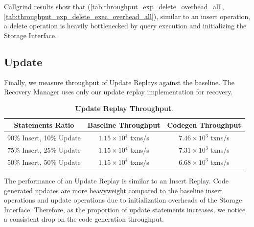 \documentclass[12pt]{cmuthesis}
\begin{document}
\begin{table}[H]
\begin{center}
\caption{\textbf{Callgrind breakdown on the Query Execution step of a Delete Replay step}.}
\label{tab:throughput_exp_delete_exec_overhead_all}
\end{center}
\end{table}

Callgrind results show that (\cref{tab:throughput_exp_delete_overhead_all}, \cref{tab:throughput_exp_delete_exec_overhead_all}), similar to an insert operation, a delete operation is heavily bottlenecked by query execution and initializing the Storage Interface.

\subsection{Update}
Finally, we measure throughput of Update Replays against the baseline. The Recovery Manager uses only our update replay implementation for recovery.
\begin{table}[H]
\begin{center}
\begin{tabular}{ c c c } 
 \toprule
\textbf{Statements Ratio} & \textbf{Baseline Throughput} & \textbf{Codegen Throughput}\\ 
 \toprule
 90\% Insert, 10\% Update & $1.15 \times 10^4$ txns/s & $7.46 \times 10^3$ txns/s\\
 \midrule
 75\% Insert, 25\% Update & $1.15 \times 10^4$ txns/s & $7.31 \times 10^3$ txns/s\\
 \midrule
 50\% Insert, 50\% Update & $1.15 \times 10^4$ txns/s & $6.68 \times 10^3$ txns/s \\ 
 \bottomrule
\end{tabular}
\caption{\textbf{Update Replay Throughput}.}
\label{tab:throughput_exp_update}
\end{center}
\end{table}
The performance of an Update Replay is similar to an Insert Replay. Code generated updates are more heavyweight compared to the baseline insert operations and update operations due to initialization overheads of the Storage Interface. Therefore, as the proportion of update statements increases, we notice a consistent drop on the code generation throughput.
\end{document}
